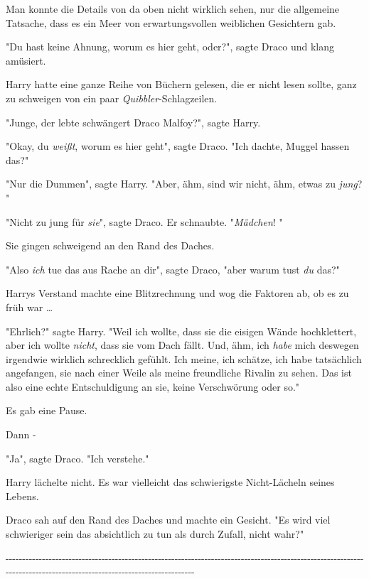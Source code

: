 {Man konnte die Details von da oben nicht wirklich sehen, nur die allgemeine Tatsache, dass es ein Meer von erwartungsvollen weiblichen Gesichtern gab.

"Du hast keine Ahnung, worum es hier geht, oder?", sagte Draco und klang amüsiert.

Harry hatte eine ganze Reihe von Büchern gelesen, die er nicht lesen sollte, ganz zu schweigen von ein paar \emph{Quibbler}-Schlagzeilen.

"Junge, der lebte schwängert Draco Malfoy?", sagte Harry.

"Okay, du \emph{weißt}, worum es hier geht", sagte Draco. "Ich dachte, Muggel hassen das?"

"Nur die Dummen", sagte Harry. "Aber, ähm, sind wir nicht, ähm, etwas zu \emph{jung}? "

"Nicht zu jung für \emph{sie}", sagte Draco. Er schnaubte. "\emph{Mädchen}! "

Sie gingen schweigend an den Rand des Daches.

"Also \emph{ich} tue das aus Rache an dir", sagte Draco, "aber warum tust \emph{du} das?"

Harrys Verstand machte eine Blitzrechnung und wog die Faktoren ab, ob es zu früh war …

"Ehrlich?" sagte Harry. "Weil ich wollte, dass sie die eisigen Wände hochklettert, aber ich wollte \emph{nicht}, dass sie vom Dach fällt. Und, ähm, ich \emph{habe} mich deswegen irgendwie wirklich schrecklich gefühlt. Ich meine, ich schätze, ich habe tatsächlich angefangen, sie nach einer Weile als meine freundliche Rivalin zu sehen. Das ist also eine echte Entschuldigung an sie, keine Verschwörung oder so."

Es gab eine Pause.

Dann -

"Ja", sagte Draco. "Ich verstehe."

Harry lächelte nicht. Es war vielleicht das schwierigste Nicht-Lächeln seines Lebens.

Draco sah auf den Rand des Daches und machte ein Gesicht. "Es wird viel schwieriger sein das absichtlich zu tun als durch Zufall, nicht wahr?"

-\/-\/-\/-\/-\/-\/-\/-\/-\/-\/-\/-\/-\/-\/-\/-\/-\/-\/-\/-\/-\/-\/-\/-\/-\/-\/-\/-\/-\/-\/-\/-\/-\/-\/-\/-\/-\/-\/-\/-\/-\/-\/-\/-\/-\/-\/-\/-\/-\/-\/-\/-\/-\/-\/-\/-\/-\/-\/-\/-\/-\/-\/-\/-\/-\/-\/-\/-\/-\/-\/-\/-\/-\/-\/-\/-\/-\/-\/-\/-\/-\/-\/-\/-\/-\/-\/-\/-\/-\/-\/-\/-\/-\/-\/-\/-\/-\/-\/-\/-\/-\/-\/-\/-\/-\/-\/-\/-\/-\/-\/-\/-\/-\/-\/-\/-\/-\/-\/-\/-\/-\/-\/-\/-\/-\/-\/-\/-\/-\/-\/-\/-\/-\/-\/-\/-\/-\/-\/-\/-\/-\/-\/-\/-\/-\/-\/-\/-\/-\/-\/-\/-\/-\/-\/-\/-\/-\/-\/-\/-\/-\/-\/-\/-\/-

}

